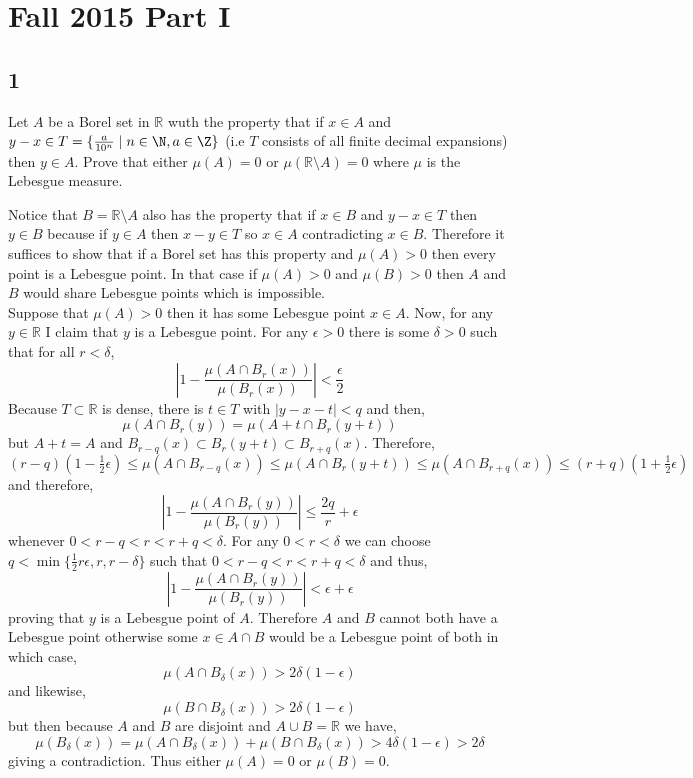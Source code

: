 \documentclass[12pt]{article}
\newcommand{\R}{\mathbb{R}}
\begin{document}
\section{Fall 2015 Part I}

\subsection{1}

\begin{exercise}
Let $A$ be a Borel set in $\R$ wuth the property that if $x \in A$ and $y - x \in T = \{ \frac{a}{10^n} \mid n \in \N, a \in \Z \}$ (i.e $T$ consists of all finite decimal expansions) then $y \in A$. Prove that either $\mu(A) = 0$ or $\mu(\R \setminus A) = 0$ where $\mu$ is the Lebesgue measure.
\end{exercise}

Notice that $B = \R \setminus A$ also has the property that if $x \in B$ and $y - x \in T$ then $y \in B$ because if $y \in A$ then $x - y \in T$ so $x \in A$ contradicting $x \in B$. Therefore it suffices to show that if a Borel set has this property and $\mu(A) > 0$ then every point is a Lebesgue point. In that case if $\mu(A) > 0$ and $\mu(B) > 0$ then $A$ and $B$ would share Lebesgue points which is impossible.
\bigskip\\
Suppose that $\mu(A) > 0$ then it has some Lebesgue point $x \in A$. Now, for any $y \in \R$ I claim that $y$ is a Lebesgue point. For any $\epsilon > 0$ there is some $\delta > 0$ such that for all $r < \delta$,
\[ \left| 1 - \frac{\mu(A \cap B_r(x))}{\mu(B_r(x))} \right| < \frac{\epsilon}{2} \]
Because $T \subset \R$ is dense, there is $t \in T$ with $|y - x - t| < q$ and then,
\[ \mu(A \cap B_r(y)) = \mu(A + t \cap B_r(y + t)) \]
but $A + t = A$ and $B_{r-q}(x) \subset B_{r}(y + t) \subset B_{r + q}(x)$. Therefore,
\[ (r - q) (1 - \tfrac{1}{2} \epsilon)  \le \mu(A \cap B_{r - q}(x)) \le \mu(A \cap B_r(y + t)) \le \mu(A \cap B_{r + q}(x)) \le (r + q)(1 + \tfrac{1}{2} \epsilon) \]
and therefore,
\[ \left| 1 - \frac{\mu(A \cap B_r(y))}{\mu(B_r(y))} \right| \le \frac{2q}{r} + \epsilon   \]
whenever $0 < r - q < r < r + q < \delta$. For any $0 < r < \delta$ we can choose $q < \min \{ \tfrac{1}{2} r \epsilon, r, r - \delta \}$ such that $0 < r - q < r < r + q < \delta$ and thus,
\[ \left| 1 - \frac{\mu(A \cap B_r(y))}{\mu(B_r(y))} \right| < \epsilon + \epsilon \]
proving that $y$ is a Lebesgue point of $A$. Therefore $A$ and $B$ cannot both have a Lebesgue point otherwise some $x \in A \cap B$ would be a Lebesgue point of both in which case,
\[ \mu(A \cap B_\delta(x)) > 2 \delta (1 - \epsilon) \]
and likewise,
\[ \mu(B \cap B_\delta(x)) > 2 \delta ( 1 - \epsilon) \]
but then because $A$ and $B$ are disjoint and $A \cup B = \R$ we have,
\[ \mu(B_\delta(x)) = \mu(A \cap B_\delta(x)) + \mu(B \cap B_\delta(x)) > 4 \delta (1 - \epsilon) > 2 \delta \]
giving a contradiction. Thus either $\mu(A) = 0$ or $\mu(B) = 0$.
\end{document}
